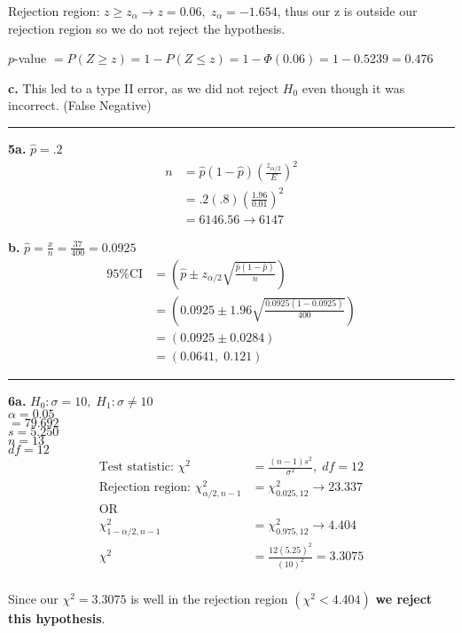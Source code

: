 \documentclass[12pt]{report}
\makeatletter
\newcommand*{\xbar}{}%
\DeclareRobustCommand*{\xbar}{%
	\mathpalette\@xbar{}%
}
\newcommand*{\@xbar}[2]{%
	\sbox0{$#1\mathrm{x}\m@th$}%
	\sbox2{$#1x\m@th$}%
	\rlap{%
		\hbox to\wd2{%
			\hfill
			$\overline{%
				\vrule width 0pt height\ht0 %
				\kern\wd0 %
			}$%
		}%
	}%
	\copy2 %
}
\newcommand{\sep}{\bigskip\hrule\bigskip}
\makeatother
\begin{document}
\noindent Rejection region: $z \geq z_\alpha \rightarrow z = 0.06, \; z_\alpha = -1.654$, thus our z is outside our rejection region so we do not reject the hypothesis.

\noindent $p$-value $ = P(Z \geq z) = 1 - P(Z \leq z) = 1 - \Phi(0.06) = 1 - 0.5239 = 0.476$

\pagebreak
\noindent \textbf{c.} This led to a type II error, as we did not reject $H_0$ even though it was incorrect. (False Negative)

\sep

\noindent \textbf{5a.} $\hat{p} = .2$
\begin{align*}
	n &= \hat{p}(1-\hat{p})\left(\frac{z_{\alpha/2}}{E}\right)^2\\
	&= .2(.8)\left(\frac{1.96}{0.01}\right)^2\\
	&= 6146.56 \rightarrow \boxed{6147}
\end{align*}

\noindent \textbf{b.} $\hat{p} = \frac{x}{n} = \frac{37}{400} = 0.0925$
\begin{align*}
	\text{95\% CI} &= \left(\hat{p} \pm z_{\alpha/2}\sqrt{\frac{\hat{p}(1 - \hat{p})}{n}}\right)\\
	&= \left(0.0925 \pm 1.96 \sqrt{\frac{0.0925(1-0.0925)}{400}}\right)\\
	&= (0.0925 \pm 0.0284)\\
	&= \boxed{(0.0641, \; 0.121)}
\end{align*}

\sep

\noindent \textbf{6a.} $H_0:\sigma = 10,\; H_1: \sigma \neq 10$\\$ \alpha = 0.05$\\$\xbar = 79.692$\\$s = 5.250$\\$n = 13$\\$df = 12$
\begin{align*}
	\text{Test statistic: } \chi^2 &= \frac{(n-1)s^2}{\sigma^2}, \; df = 12\\
	\text{Rejection region: } \chi^2_{\alpha/2, n-1} &= \chi^2_{0.025, 12} \rightarrow 23.337\\
	\text{OR}\\
	\chi^2_{1-\alpha/2, n-1} &= \chi^2_{0.975, 12} \rightarrow 4.404\\
	\chi^2 &= \frac{12(5.25)^2}{(10)^2} = 3.3075 \\
\end{align*}
 
\noindent Since our $\chi^2 = 3.3075$ is well in the rejection region $(\chi^2 < 4.404)$ \textbf{we reject this hypothesis}.\\
\end{document}
